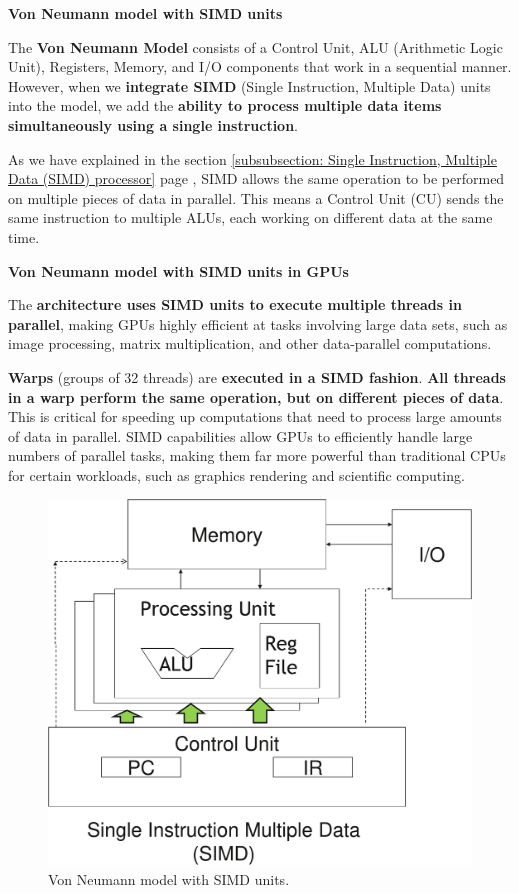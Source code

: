 \highspace
\begin{flushleft}
    \textcolor{Green3}{ \textbf{Von Neumann model with SIMD units}}
\end{flushleft}
The \textbf{Von Neumann Model} consists of a Control Unit, ALU (Arithmetic Logic Unit), Registers, Memory, and I/O components that work in a sequential manner. However, when we \textbf{integrate SIMD} (Single Instruction, Multiple Data) units into the model, we add the \textbf{ability to process multiple data items simultaneously using a single instruction}.

\highspace
As we have explained in the section \ref{subsubsection: Single Instruction, Multiple Data (SIMD) processor} page \pageref{subsubsection: Single Instruction, Multiple Data (SIMD) processor}, SIMD allows the same operation to be performed on multiple pieces of data in parallel. This means a Control Unit (CU) sends the same instruction to multiple ALUs, each working on different data at the same time.

\newpage

\begin{flushleft}
    \textcolor{Green3}{ \textbf{Von Neumann model with SIMD units in GPUs}}
\end{flushleft}
The \textbf{architecture uses SIMD units to execute multiple threads in parallel}, making GPUs highly efficient at tasks involving large data sets, such as image processing, matrix multiplication, and other data-parallel computations.

\highspace
\textbf{Warps} (groups of 32 threads) are \textbf{executed in a SIMD fashion}. \textbf{All threads in a warp perform the same operation, but on different pieces of data}. This is critical for speeding up computations that need to process large amounts of data in parallel. SIMD capabilities allow GPUs to efficiently handle large numbers of parallel tasks, making them far more powerful than traditional CPUs for certain workloads, such as graphics rendering and scientific computing.

\begin{figure}[!htp]
    \centering
    \includegraphics[width=.6\textwidth]{img/von-neumann-model-with-simd-1.pdf}
    \caption{Von Neumann model with SIMD units.}
\end{figure}

